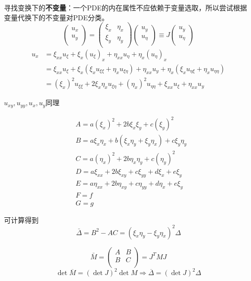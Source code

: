 寻找变换下的\textbf{不变量}：一个PDE的内在属性不应依赖于变量选取，所以尝试根据变量代换下的不变量对PDE分类。
$$\left(\begin{array}{c}{{u_{x}}}\\{{u_{y}}}\\\end{array}\right)=\left(\begin{array}{cc}{{\xi_{x}}}&{{\eta_{x}}}\\{{\xi_{y}}}&{{\eta_{y}}}\\\end{array}\right)\left(\begin{array}{c}{{u_{y}}}\\{{u_{\eta}}}\\\end{array}\right)
\equiv J\left(\begin{array}{c}{{u_{y}}}\\{{u_{\eta}}}\\\end{array}\right)$$
$$\begin{aligned}
    u_{x}&=\xi_{xx}u_{\xi}+\xi_{x}(u_{\xi})_{x}+\eta_{xx}u_{\eta}+\eta_{x}(u_{\eta})_{x}\\
    &=\xi_{xx}u_{\xi}+\xi_{x}(\xi_{x}u_{\xi\xi}+\eta_{x}u_{\xi\eta})+\eta_{xx}u_{y}+\eta_{x}(\xi_{x}u_{\eta\xi}+\eta_{x}u_{\eta\eta})\\
    &=(\xi_{x})^{2}u_{\xi\xi}+2\xi_{x}\eta_{x}u_{\xi\eta}+(\eta_{x})^{2}u_{\eta\eta}+\xi_{xx}u_{\xi}+\eta_{xx}u_{y}
\end{aligned}$$

$u_{xy},u_{yy},u_{x},u_{y}$同理

$$\begin{aligned}
    &A=a(\xi_x)^{2}+2b\xi_x\xi_y+c(\xi_y)^{2}\\
    &B=a\xi_x\eta_{x}+b(\xi_x\eta_{y}+\xi_y\eta_{x})+c\xi_y\eta_{y}\\
    &C=a(\eta_{x})^{2}+2b\eta_{x}\eta_{y}+c(\eta_{y})^{2}\\
    &D=a\xi_{xx}+2b\xi_{xy}+c\xi_{yy}+d\xi_{x}+e\xi_{y}\\
    &E=a\eta_{xx}+2b\eta_{xy}+c\eta_{yy}+d\eta_{x}+e\xi_{y}\\
    &F=f\\
    &G=g
\end{aligned}$$

可计算得到
    $$\bar{\Delta}=B^2-AC=(\xi_x\eta_y-\xi_y\eta_x)^2\Delta$$

    $$\bar{M}=\left(\begin{array}{cc}{A}&{B}\\{B}&{C}\\\end{array}\right)=J^{T}{M}J$$
    $$\det\overline{M}=(\det{J})^2\det M\Rightarrow\overline{\Delta}=(\det J)^2\Delta $$
    
